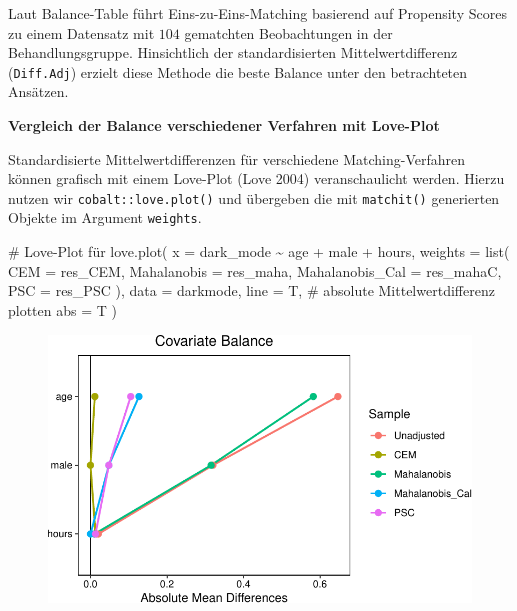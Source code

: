 \documentclass[
  a4paper,
  DIV=11,
  oneside]{scrreprt}
\newenvironment{Shaded}{\begin{snugshade}}{\end{snugshade}}
\newcommand{\AttributeTok}[1]{\textcolor[rgb]{0.40,0.45,0.13}{#1}}
\newcommand{\CommentTok}[1]{\textcolor[rgb]{0.37,0.37,0.37}{#1}}
\newcommand{\FunctionTok}[1]{\textcolor[rgb]{0.28,0.35,0.67}{#1}}
\newcommand{\NormalTok}[1]{\textcolor[rgb]{0.00,0.23,0.31}{#1}}
\newcommand{\SpecialCharTok}[1]{\textcolor[rgb]{0.37,0.37,0.37}{#1}}
\begin{document}
Laut Balance-Table führt Eins-zu-Eins-Matching basierend auf Propensity
Scores zu einem Datensatz mit \(104\) gematchten Beobachtungen in der
Behandlungsgruppe. Hinsichtlich der standardisierten Mittelwertdifferenz
(\texttt{Diff.Adj}) erzielt diese Methode die beste Balance unter den
betrachteten Ansätzen.

\textbf{Vergleich der Balance verschiedener Verfahren mit Love-Plot}

Standardisierte Mittelwertdifferenzen für verschiedene
Matching-Verfahren können grafisch mit einem Love-Plot (Love 2004)
veranschaulicht werden. Hierzu nutzen wir \texttt{cobalt::love.plot()}
und übergeben die mit \texttt{matchit()} generierten Objekte im Argument
\texttt{weights}.

\begin{Shaded}
\begin{Highlighting}[]
\CommentTok{\# Love{-}Plot für}
\FunctionTok{love.plot}\NormalTok{(}
  \AttributeTok{x =}\NormalTok{ dark\_mode }\SpecialCharTok{\textasciitilde{}}\NormalTok{ age }\SpecialCharTok{+}\NormalTok{ male }\SpecialCharTok{+}\NormalTok{ hours, }
  \AttributeTok{weights =} \FunctionTok{list}\NormalTok{(}
    \AttributeTok{CEM =}\NormalTok{ res\_CEM,}
    \AttributeTok{Mahalanobis =}\NormalTok{ res\_maha,}
    \AttributeTok{Mahalanobis\_Cal =}\NormalTok{ res\_mahaC,}
    \AttributeTok{PSC =}\NormalTok{ res\_PSC}
\NormalTok{  ),}
  \AttributeTok{data =}\NormalTok{ darkmode, }
  \AttributeTok{line =}\NormalTok{ T,}
  \CommentTok{\# absolute Mittelwertdifferenz plotten}
  \AttributeTok{abs =}\NormalTok{ T}
\NormalTok{)}
\end{Highlighting}
\end{Shaded}

\begin{figure}[t]

{\centering \includegraphics{Matching_files/figure-pdf/unnamed-chunk-36-1.pdf}

}

\end{figure}
\end{document}
